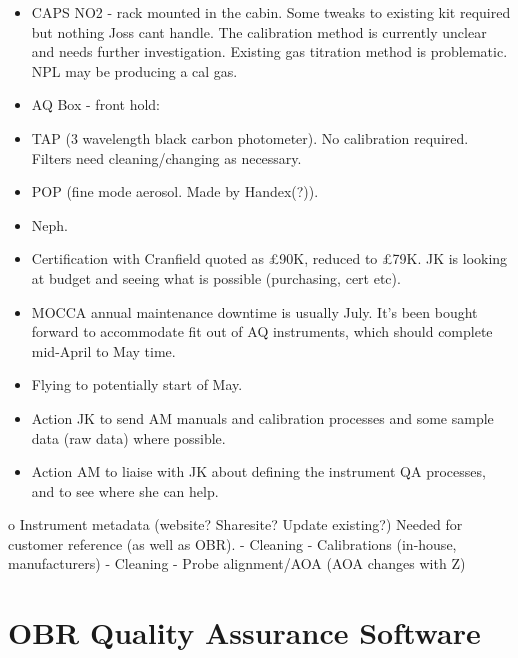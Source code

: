 \documentclass[11pt]{article} %
\begin{document}
\begin{itemize}
\item	CAPS NO2 - rack mounted in the cabin. Some tweaks to existing kit required but nothing Joss cant handle. The calibration method is currently unclear and needs further investigation.  Existing gas titration method is problematic. NPL may be producing a cal gas.
\item	AQ Box - front hold:
\item	TAP (3 wavelength black carbon photometer). No calibration required. Filters need cleaning/changing as necessary. 
\item	POP (fine mode aerosol. Made by Handex(?)).
\item	Neph.
\item 	Certification with Cranfield quoted as £90K, reduced to £79K. JK is looking at budget and seeing what is possible (purchasing, cert etc).
\item	MOCCA annual maintenance downtime is usually July. It's been bought forward to accommodate fit out of AQ instruments, which should complete mid-April to May time.
\item	Flying to potentially start of May. 
\item	Action JK to send AM manuals and calibration processes and some sample data (raw data) where possible.
\item Action AM to liaise with JK about defining the instrument QA processes, and to see where she can help.
\end{itemize}
o	Instrument metadata (website? Sharesite? Update existing?) Needed for customer reference (as well as OBR).
- Cleaning
-	Calibrations (in-house, manufacturers)
-	Cleaning
-	Probe alignment/AOA (AOA changes with Z)


\newpage
\section{OBR Quality Assurance Software}
\end{document}
